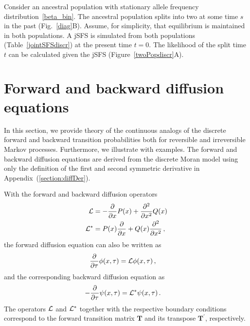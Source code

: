 \documentclass[preprint]{elsarticle}
\begin{document}
Consider an ancestral population with stationary allele frequency distribution~\eqref{beta_bin}. The ancestral population splits into two at some time $s$ in the past (Fig.~\ref{diag}B). Assume, for simplicity, that equilibrium is maintained in both populations. A jSFS is simulated from both populations (Table~\ref{jointSFSdiscr}) at the present time $t=0$. The likelihood of the split time $t$ can be calculated given the jSFS (Figure~\ref{twoPopdiscr}A).



\section{Forward and backward diffusion equations}\label{forwBackDiff}

In this section, we provide theory of the continuous analogs of the discrete forward and backward transition probabilities both for reversible and irreversible Markov processes. Furthermore, we illustrate with examples.
The forward and backward diffusion equations are derived from the discrete Moran model using only the definition of the first and second symmetric derivative in Appendix~(\ref{section:diffDer}).

With the forward and backward diffusion operators 
\begin{equation}
 \begin{split}
     {\cal L}&=-\frac{\partial}{\partial x}P(x)+ \frac{\partial^2}{\partial x^2}Q(x)\\
     {\cal L}^{*}&=P(x)\frac{\partial}{\partial x} +Q(x)\frac{\partial^2}{\partial x^2}\,,
 \end{split}
\end{equation}
the forward diffusion equation can also be written as
\begin{equation}\label{eq:forw_general}
\begin{split}
\frac{\partial}{\partial \tau}\phi(x,\tau)&={\cal L} \phi(x, \tau)\,,
\end{split}
\end{equation}
and the corresponding backward diffusion equation as
\begin{equation}\label{eq:backw_general}
\begin{split}
-\frac{\partial}{\partial \tau}\psi(x,\tau)&={\cal L}^{*} \psi(x, \tau)\,.
\end{split}
\end{equation}
The operators ${\cal L}$ and ${\cal L}^{*}$ together with the respective boundary conditions correspond to the forward transition matrix $\mathbf{T}$ and its transpose $\mathbf{T}^{'}$, respectively. 
\end{document}
